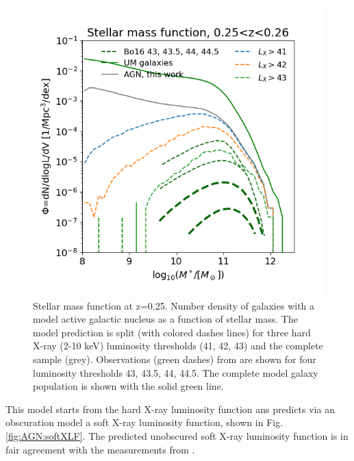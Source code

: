 \documentclass[twocolumn,iop]{openjournal}
\begin{document}
\begin{figure}
    \centering
    \includegraphics[width=0.95\linewidth]{figures_AGN/SMF_z025.png}
    \caption{Stellar mass function at z=0.25. 
    Number density of galaxies with a model active galactic nucleus as a function of stellar mass. 
    The model prediction is split (with colored dashes lines) for three hard X-ray (2-10 keV) luminosity thresholds (41, 42, 43) and the complete sample (grey).
    Observations (green dashes) from \citet[][Bo16]{BongiornoSchulzeMerloni_2016A&A...588A..78B} are shown for four luminosity thresholds 43, 43.5, 44, 44.5.
    The complete model galaxy population is shown with the solid green line.}
    \label{fig:AGN:SMF}
\end{figure}

This model starts from the hard X-ray luminosity function ans predicts via an obscuration model a soft X-ray luminosity function, shown in Fig. \ref{fig:AGN:softXLF}. 
The predicted unobscured soft X-ray luminosity function is in fair agreement with the measurements from \citet{HasingerMiyajiSchmidt2005A&A...441..417H}. 
\end{document}
